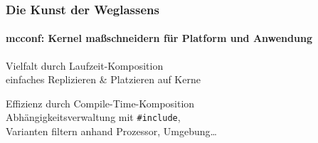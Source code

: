 


\begin{frame}
  \frametitle{Die Kunst der Weglassens}
  \framesubtitle{mcconf: Kernel maßschneidern für Platform und Anwendung}

  \begin{description}[Komponenten]
  \item[Komponenten] Vielfalt durch Laufzeit-Komposition\\
    einfaches Replizieren \& Platzieren auf Kerne
  \item[Module] Effizienz durch Compile-Time-Komposition\\
    Abhängigkeitsverwaltung mit \texttt{\#include},\\
    Varianten filtern anhand Prozessor, Umgebung\ldots
  \end{description}

\end{frame}
